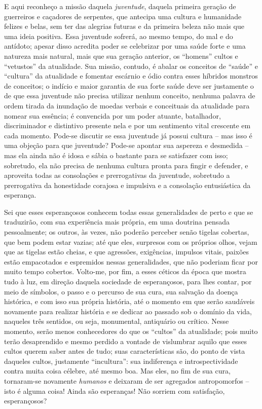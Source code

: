     E aqui reconheço a missão daquela \emph{juventude}, daquela primeira
    geração de guerreiros e caçadores de serpentes, que antecipa uma
    cultura e humanidade felizes e belas, sem ter das alegrias futuras e
    da primeira beleza não mais que uma ideia positiva. Essa juventude
    sofrerá, ao mesmo tempo, do mal e do antídoto; apesar disso acredita
    poder se celebrizar por uma saúde forte e uma natureza mais natural,
    mais que sua geração anterior, os ``homens'' cultos e ``vetustos''
    da atualidade. Sua missão, contudo, é abalar os conceitos de
    ``saúde'' e ``cultura'' da atualidade e fomentar escárnio e ódio
    contra esses híbridos monstros de conceitos; o indício e maior
    garantia de sua forte saúde deve ser justamente o de que essa
    juventude não precisa utilizar nenhum conceito, nenhuma palavra de
    ordem tirada da inundação de moedas verbais e conceituais da
    atualidade para nomear sua essência; é convencida por um poder
    atuante, batalhador, discriminador e distintivo presente nela e por
    um sentimento vital crescente em cada momento. Pode-se discutir se
    essa juventude já possui cultura -- mas isso é uma objeção para que
    juventude? Pode-se apontar sua aspereza e desmedida -- mas ela ainda
    não é idosa e sábia o bastante para se satisfazer com isso;
    sobretudo, ela não precisa de nenhuma cultura pronta para fingir e
    defender, e aproveita todas as consolações e prerrogativas da
    juventude, sobretudo a prerrogativa da honestidade corajosa e
    impulsiva e a consolação entusiástica da esperança.

    Sei que esses esperançosos conhecem todas essas generalidades de
    perto e que se traduzirão, com sua experiência mais própria, em uma
    doutrina pensada pessoalmente; os outros, às vezes, não poderão
    perceber senão tigelas cobertas, que bem podem estar vazias; até que
    eles, surpresos com os próprios olhos, vejam que as tigelas estão
    cheias, e que agressões, exigências, impulsos vitais, paixões estão
    empacotados e espremidos nessas generalidades, que não poderiam
    ficar por muito tempo cobertos. Volto-me, por fim, a esses céticos da
    época que mostra tudo à luz, em direção daquela sociedade de
    esperançosos, para lhes contar, por meio de símbolos, o passo e o
    percurso de sua cura, sua salvação da doença histórica, e com isso
    sua própria história, até o momento em que serão saudáveis novamente
    para realizar história e se dedicar ao passado sob o domínio da
    vida, naqueles três sentidos, ou seja, monumental, antiquário ou
    crítico. Nesse momento, serão menos conhecedores do que os
    ``cultos'' da atualidade; pois muito terão desaprendido e mesmo
    perdido a vontade de vislumbrar aquilo que esses cultos querem saber
    antes de tudo; suas características são, do ponto de vista daqueles
    cultos, justamente ``incultura'': sua indiferença e
    introspectividade contra muita coisa célebre, até mesmo boa. Mas
    eles, no fim de sua cura, tornaram-se novamente \emph{humanos} e
    deixaram de ser agregados antropomorfos -- isto é alguma coisa!
    Ainda são esperanças! Não sorriem com satisfação, esperançosos?

